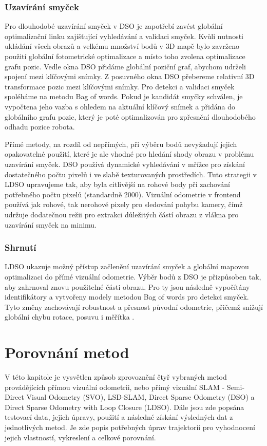 \documentclass[12pt,a4paper]{report}
\begin{document}
\subsection*{Uzavírání smyček}
Pro dlouhodobé uzavírání smyček v DSO je zapotřebí zavést globální optimalizační linku zajišťující vyhledávání a validaci smyček. Kvůli nutnosti ukládání všech obrazů a velkému množství bodů v 3D mapě bylo zavrženo použití globální fotometrické optimalizace a místo toho zvolena optimalizace grafu pozic. Vedle okna DSO přidáme globální poziční graf, abychom udrželi spojení mezi klíčovými snímky. Z posuvného okna DSO přebereme relativní 3D transformace pozic mezi klíčovými snímky. Pro detekci a validaci smyček spoléháme na metodu Bag of words. Pokud je kandidát smyčky schválen, je vypočtena jeho vazba s ohledem na aktuální klíčový snímek a přidána do globálního grafu pozic, který je poté optimalizován pro zpřesnění dlouhodobého odhadu pozice robota.

Přímé metody, na rozdíl od nepřímých, při výběru bodů nevyžadují jejich opakovatelné použití, které je ale vhodné pro hledání shody obrazu v problému uzavírání smyček. DSO používá dynamické vyhledávání v mřížce pro získání dostatečného počtu pixelů i ve slabě texturovaných prostředích. Tuto strategii v LDSO upravujeme tak, aby byla citlivější na rohové body při zachování potřebného počtu pixelů (standardně 2000). Vizuální odometrie v frontend používá jak rohové, tak nerohové pixely pro sledování pohybu kamery, čímž udržuje dodatečnou režii pro extrakci důležitých částí obrazu z vlákna pro uzavírání smyček na minimu.

\subsection*{Shrnutí}
LDSO ukazuje možný přístup začlenění uzavírání smyček a globální mapovou optimalizaci do přímé vizuální odometrie. Výběr bodů z DSO je přizpůsoben tak, aby zahrnoval znovu použitelné části obrazu. Pro ty jsou následně vypočítány identifikátory a vytvořeny modely metodou Bag of words pro detekci smyček. Tyto změny zachovávají robustnost a přesnost původní odometrie, přičemž snižují globální chybu rotace, posuvu i měřítka \cite{LDSO}.


\chapter{Porovnání metod}
V této kapitole je vysvětlen způsob zprovoznění čtyř vybraných metod provádějících přímou vizuální odometrii, nebo přímý vizuální SLAM - Semi-Direct Visual Odometry (SVO), LSD-SLAM, Direct Sparse Odometry (DSO) a Direct Sparse Odometry with Loop Closure (LDSO). Dále jsou zde popsána testovací data, jejich úpravy, použití a následné získání výsledných dat z jednotlivých metod. Je zde popis potřebných úprav trajektorií pro vyhodnocení jejich vlastností, vykreslení a celkové porovnání.
\end{document}
